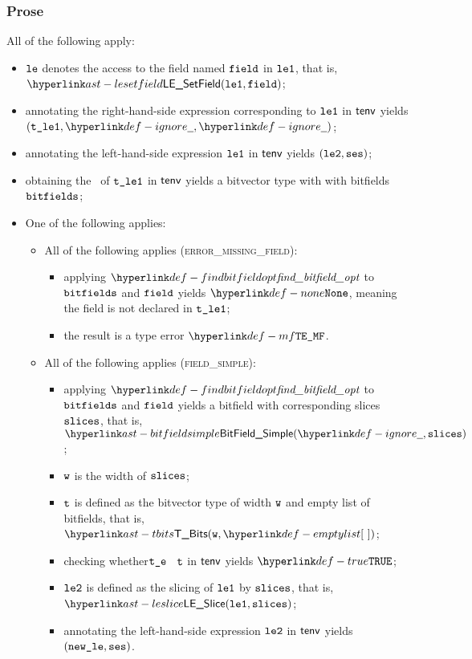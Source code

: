 \subsubsection{Prose}
All of the following apply:
\begin{itemize}
  \item $\texttt{le}$ denotes the access to the field named $\texttt{field}$ in $\texttt{le1}$, that is, \\ $\LESetField(\vleone, \field)$;
  \item annotating the right-hand-side expression corresponding to $\texttt{le1}$ in $\textsf{tenv}$ yields \\ $(\vtleone, \Ignore, \Ignore)$\ProseOrTypeError;
  \item annotating the left-hand-side expression $\texttt{le1}$ in $\textsf{tenv}$ yields $(\texttt{le2}, \texttt{ses})$\ProseOrTypeError;
  \item obtaining the \underlyingtype\ of $\texttt{t\_le1}$ in $\textsf{tenv}$ yields a bitvector type with with bitfields $\texttt{bitfields}$\ProseOrTypeError;
  \item One of the following applies:
  \begin{itemize}
    \item All of the following applies (\textsc{error\_missing\_field}):
    \begin{itemize}
      \item applying $\findbitfieldopt$ to $\texttt{bitfields}$ and $\texttt{field}$ yields $\None$, meaning the field is not declared
            in $\texttt{t\_le1}$;
      \item the result is a type error $\MissingField$.
    \end{itemize}

    \item All of the following applies (\textsc{field\_simple}):
    \begin{itemize}
      \item applying $\findbitfieldopt$ to $\texttt{bitfields}$ and $\texttt{field}$ yields a bitfield with corresponding slices $\texttt{slices}$,
            that is, $\BitFieldSimple(\Ignore, \slices)$;
      \item $\texttt{w}$ is the width of $\texttt{slices}$;
      \item $\texttt{t}$ is defined as the bitvector type of width $\texttt{w}$ and empty list of bitfields, that is, $\TBits(\vw, \emptylist)$;
      \item checking whether$\texttt{t\_e}$ \typesatisfies\ $\texttt{t}$ in $\textsf{tenv}$ yields $\True$\ProseOrTypeError;
      \item $\texttt{le2}$ is defined as the slicing of $\texttt{le1}$ by $\texttt{slices}$, that is, \\ $\LESlice(\vleone, \slices)$;
      \item annotating the left-hand-side expression $\texttt{le2}$ in $\textsf{tenv}$ yields \\ $(\texttt{new\_le}, \texttt{ses})$\ProseOrTypeError.
    \end{itemize}


\end{itemize}
\end{itemize}
